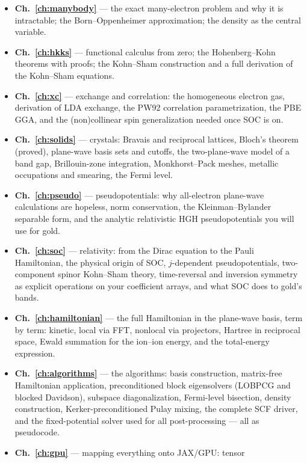 \begin{itemize}[leftmargin=2em]
\item \textbf{Ch.~\ref{ch:manybody}} --- the exact many-electron problem and
why it is intractable; the Born--Oppenheimer approximation; the density as
the central variable.
\item \textbf{Ch.~\ref{ch:hkks}} --- functional calculus from zero; the
Hohenberg--Kohn theorems with proofs; the Kohn--Sham construction and a full
derivation of the Kohn--Sham equations.
\item \textbf{Ch.~\ref{ch:xc}} --- exchange and correlation: the homogeneous
electron gas, derivation of LDA exchange, the PW92 correlation
parametrization, the PBE GGA, and the (non)collinear spin generalization
needed once SOC is on.
\item \textbf{Ch.~\ref{ch:solids}} --- crystals: Bravais and reciprocal
lattices, Bloch's theorem (proved), plane-wave basis sets and cutoffs, the
two-plane-wave model of a band gap, Brillouin-zone integration,
Monkhorst--Pack meshes, metallic occupations and smearing, the Fermi level.
\item \textbf{Ch.~\ref{ch:pseudo}} --- pseudopotentials: why all-electron
plane-wave calculations are hopeless, norm conservation, the
Kleinman--Bylander separable form, and the analytic relativistic HGH
pseudopotentials you will use for gold.
\item \textbf{Ch.~\ref{ch:soc}} --- relativity: from the Dirac equation to
the Pauli Hamiltonian, the physical origin of SOC, $j$-dependent
pseudopotentials, two-component spinor Kohn--Sham theory, time-reversal and
inversion symmetry as explicit operations on your coefficient arrays, and
what SOC does to gold's bands.
\item \textbf{Ch.~\ref{ch:hamiltonian}} --- the full Hamiltonian in the
plane-wave basis, term by term: kinetic, local via FFT, nonlocal via
projectors, Hartree in reciprocal space, Ewald summation for the ion--ion
energy, and the total-energy expression.
\item \textbf{Ch.~\ref{ch:algorithms}} --- the algorithms: basis
construction, matrix-free Hamiltonian application, preconditioned block
eigensolvers (LOBPCG and blocked Davidson), subspace diagonalization,
Fermi-level bisection, density construction, Kerker-preconditioned Pulay
mixing, the complete SCF driver, and the fixed-potential solver used for
all post-processing --- all as pseudocode.
\item \textbf{Ch.~\ref{ch:gpu}} --- mapping everything onto JAX/GPU: tensor

\end{itemize}
